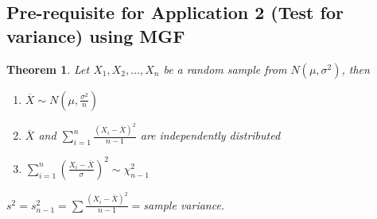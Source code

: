 \documentclass[oneside,11pt,pdftex]{book}%
\numberwithin{equation}{section}
\newtheorem{theorem}{Theorem}[chapter]%
\numberwithin{section}{chapter}
\numberwithin{equation}{chapter}
\begin{document}
\subsection{Pre-requisite for Application 2 (Test for variance) using MGF}
\begin{theorem}
	Let $ X_1, X_2, \dots, X_n $ be a random sample from $ N(\mu, \sigma^2) $, then 
	\begin{enumerate}
		\item $ \overline
		X \sim N\left(\mu, \frac{\sigma^2}{n}\right)$
		\item $ \overline{X} $ and $ \sum_{i=1}^n \frac{(X_i-\overline{X})^2}{n-1} $ are independently distributed
		\item $ \sum_{i=1}^n \left(\frac{X_i-\overline{X}}{\sigma}\right)^2\sim \chi^2_{n-1} $
	\end{enumerate}
	$ s^2=s^2_{n-1}=\sum \frac{(X_i-\overline{X})^2}{n-1} =$sample variance.
\end{theorem}
\end{document}
